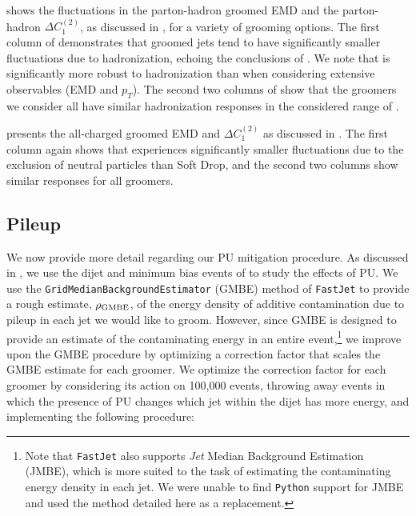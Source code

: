  shows the fluctuations in the parton-hadron groomed EMD and the parton-hadron \(\Delta C_1^{(2)}\), as discussed in , for a variety of grooming options.
%
The first column of  demonstrates that  groomed jets tend to have significantly smaller fluctuations due to hadronization, echoing the conclusions of .
%
We note that  is significantly more robust to hadronization than  when considering extensive observables (EMD and \(p_T\)).
%
The second two columns of  show that the \PIRANHA{} groomers we consider all have similar hadronization responses in the considered range of \zcut.

 presents the all-charged groomed EMD and \(\Delta C_1^{(2)}\) as discussed in .
%
The first column again shows that  experiences significantly smaller fluctuations due to the exclusion of neutral particles than Soft Drop, and the second two columns show similar responses for all \PIRANHA{} groomers.


\subsection{Pileup}
\label{app:pufrenzy}

We now provide more detail regarding our PU mitigation procedure.
%
As discussed in , we use the dijet and minimum bias events of  to study the effects of PU.
%
We use the \texttt{GridMedianBackgroundEstimator} (GMBE) method of \texttt{FastJet} \cite{Cacciari:2011ma} to provide a rough estimate, \(\rho_{\rm GMBE}\), of the energy density of additive contamination due to pileup in each jet we would like to groom.
%
However, since GMBE is designed to provide an estimate of the contaminating energy in an entire event,\footnote{
Note that \texttt{FastJet} also supports \textit{Jet} Median Background Estimation (JMBE), which is more suited to the task of estimating the contaminating energy density in each jet.
%
We were unable to find \texttt{Python} support for JMBE and used the method detailed here as a replacement.
} we improve upon the GMBE procedure by optimizing a correction factor that scales the GMBE estimate for each groomer.
%
We optimize the correction factor for each groomer by considering its action on 100,000 events, throwing away events in which the presence of PU changes which jet within the dijet has more energy, and implementing the following procedure:

